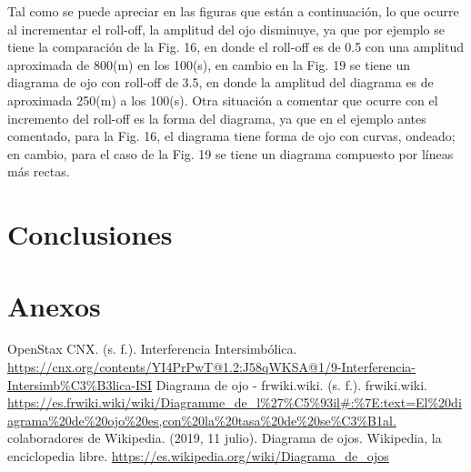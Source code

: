 \documentclass[lettersize,journal]{IEEEtran}
\begin{document}
Tal como se puede apreciar en las figuras que están a continuación, lo que ocurre al incrementar el roll-off, la amplitud del ojo disminuye, ya que por ejemplo se tiene la comparación de la Fig. 16, en donde el roll-off es de 0.5 con una amplitud aproximada de 800(m) en los 100(s), en cambio en la Fig. 19 se tiene un diagrama de ojo con roll-off de 3.5, en donde la amplitud del diagrama es de aproximada 250(m) a los 100(s). Otra situación a comentar que ocurre con el incremento del roll-off es la forma del diagrama, ya que en el ejemplo antes comentado, para la Fig. 16, el diagrama tiene forma de ojo con curvas, ondeado; en cambio, para el caso de la Fig. 19 se tiene un diagrama compuesto por líneas más rectas.

\section{Conclusiones}\label{sec:conclusiones}
\newpage

\section{Anexos}\label{sec:anexo}


\begin{thebibliography}{}
  OpenStax CNX. (s. f.). Interferencia Intersimbólica. \url{https://cnx.org/contents/YI4PrPwT@1.2:J58qWKSA@1/9-Interferencia-Intersimb\%C3\%B3lica-ISI}
  Diagrama de ojo - frwiki.wiki. (s. f.). frwiki.wiki. \url{https://es.frwiki.wiki/wiki/Diagramme\_de\_l\%27\%C5\%93il\#:\%7E:text=El\%20diagrama\%20de\%20ojo\%20es,con\%20la\%20tasa\%20de\%20se\%C3\%B1al.}
    colaboradores de Wikipedia. (2019, 11 julio). Diagrama de ojos. Wikipedia, la enciclopedia libre. \url{https://es.wikipedia.org/wiki/Diagrama\_de\_ojos}

  
      


\end{thebibliography}



\end{document}
